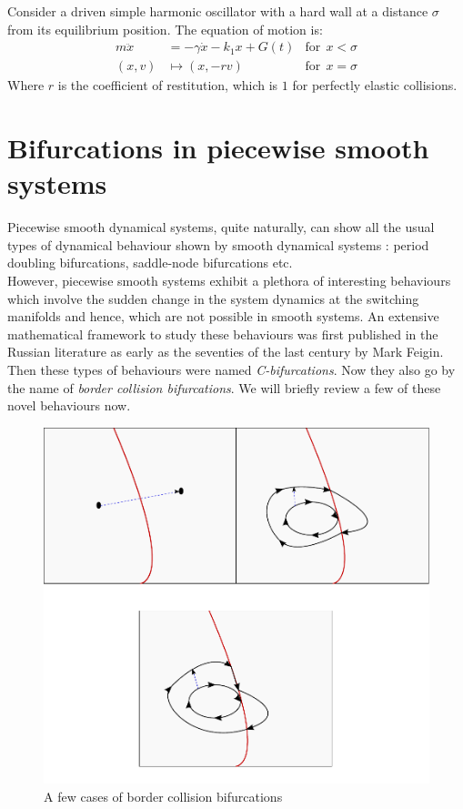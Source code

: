 \documentclass{book}
\renewcommand{\(}{\begin{columns}}
\renewcommand{\)}{\end{columns}}
\newcommand{\<}[1]{\begin{column}{#1}}
\renewcommand{\>}{\end{column}}
\begin{document}
Consider a driven simple harmonic oscillator with a hard wall at a distance 
$\sigma$ from its equilibrium position.   The equation of motion is:
\begin{align}
\label{eq-hard_impact}
m\ddot{x}&=-\gamma \dot{x}-k_1x+G(t)&\mathrm{for}~~x<\sigma\\
(x,v)&\mapsto (x,-rv)&\mathrm{for}~~x=\sigma
\end{align}
Where $r$ is the coefficient of restitution, which is $1$ for perfectly 
elastic collisions.  


\section{Bifurcations in piecewise smooth systems}
Piecewise smooth dynamical systems, quite naturally, can show all the usual 
types of dynamical behaviour shown by smooth dynamical systems : period 
doubling\cite[p.~166-170]{hilborn-chaos} bifurcations, 
saddle-node\cite[p.~109]{hilborn-chaos} bifurcations etc.  \\

However,  piecewise smooth systems exhibit a plethora of interesting behaviours
which involve the sudden change in the system dynamics at the switching 
manifolds and hence, which are not possible in smooth systems. An extensive mathematical 
framework to study these behaviours was first published in the Russian 
literature as early as the seventies of the last century by Mark Feigin\cite{feigin-1970}.
Then these types of behaviours were named \emph{C-bifurcations}.  Now they also go by 
the name of \emph{border collision bifurcations}. We will briefly review a few 
of these novel  behaviours now.   

\begin{figure}[!htp]
\caption{A few cases of border collision bifurcations}
\begin{center}
\includegraphics[width=0.9\columnwidth]{c-bifs}
\end{center}
\end{figure}
\end{document}
